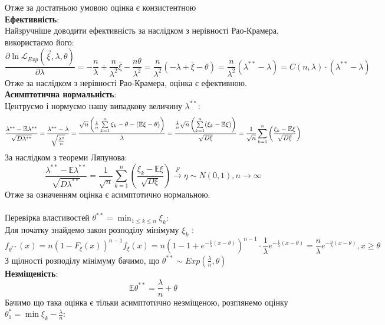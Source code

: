 \documentclass[11 pt]{article}
\newcommand*\circled[1]{\tikz[baseline=(char.base)]{
            \node[shape=circle,draw,inner sep=2pt] (char) {#1};}}
\begin{document}
Отже за достатньою умовою оцінка є конзистентною \\ 
\textbf{Ефективність}: \\ 
Найзручніше доводити ефективність за наслідком з нерівності Рао-Крамера, використаємо його: \\ 
$$
\frac{\partial \ln{\mathcal{L}_{Exp}(\vec{\xi}, \lambda, \theta)}}{\partial \lambda} = 
-\frac{n}{\lambda} + \frac{n}{\lambda^2} \overline{\xi} - \frac{n \theta}{\lambda^2}
= \frac{n}{\lambda^2}(- \lambda + \overline{\xi} - \theta) 
= \frac{n}{\lambda^2}(\lambda^{**} - \lambda) = 
C(n, \lambda) \cdot  (\lambda^{**} - \lambda)
$$
Отже за наслідком з нерівності Рао-Крамера, оцінка є ефективною. \\ 
\textbf{Асимптотична нормальність}: \\
Центруємо і нормуємо нашу випадкову величину $\lambda^{**}$:
$$
\frac{\lambda^{**} - \mathbb{E} \lambda^{**}}{ \sqrt{D \lambda^{**}} }
= \frac{\lambda^{**} - \lambda }{ \sqrt{\frac{\lambda^2}{n}}}
= \frac{ \sqrt{n} \left(\frac{1}{n}\sum_{k = 1}^{n}\limits \xi_k - \theta - (\mathbb{E} \xi - \theta) \right)}{ \lambda}
= \frac{\frac{1}{n} \sqrt{n} \left( \sum_{k = 1}^{n}\limits (\xi_k - \mathbb{E} \xi)   \right) }{ \sqrt{D \xi} } = 
\frac{1}{ \sqrt{n} }\sum_{k = 1}^{n} \left(\frac{ \xi_k - \mathbb{E} \xi}{ \sqrt{D \xi} } \right)  
$$
За наслідком з теореми Ляпунова: 
$$ 
\frac{\lambda^{**} - \mathbb{E} \lambda^{**}}{ \sqrt{D \lambda^{**}} } = 
\frac{1}{ \sqrt{n} }\sum_{k = 1}^{n} \left(\frac{ \xi_k - \mathbb{E} \xi}{ \sqrt{D \xi} } \right)
\stackrel{F}{\longrightarrow } \eta \sim N(0,1), n \to \infty
$$
Отже за означенням оцінка є асимптотично нормальною.\\  \\ 
\circled{2} Перевірка властивостей $\theta^{**} = \min_{1 \le k \le n}\limits \xi_k$: \\ 
Для початку знайдемо закон розподілу мінімуму $\xi_k$ :\\
$$
f_{\theta^{**}}(x) = n(1-F_{\xi}(x))^{n-1}f_{\xi}(x) = 
n\left(1-1+e^{-\frac{1}{\lambda}(x-\theta)}\right)^{n-1} 
\cdot \frac{1}{\lambda}e^{-\frac{1}{\lambda}(x-\theta)}
= \frac{n}{\lambda} e^{-\frac{n}{\lambda}(x-\theta)}, x\geq\theta
$$
З щілності розподілу мінімуму бачимо, що $\theta^{**} \sim Exp(\frac{\lambda}{n}, \theta)$ \\  
\textbf{Незміщеність}: \\ 
$$ 
\mathbb{E} \theta^{**} = \frac{\lambda}{n} + \theta
$$ 
Бачимо що така оцінка є тільки асимптотично незміщеною, розглянемо оцінку 
$\theta^*_1 = \min \xi_k - \frac{\lambda}{n}$:
\end{document}
